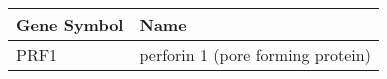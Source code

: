 \begin{tabular}{ll}
\toprule
Gene Symbol &                              Name \\
\midrule
       PRF1 & perforin 1 (pore forming protein) \\
\bottomrule
\end{tabular}
